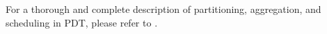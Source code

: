 \documentclass{anstrans}
\begin{document}
For a thorough and complete description of partitioning, aggregation, and scheduling in PDT, please refer to \cite{mpadams2015}.
%
%
%
\end{document}
